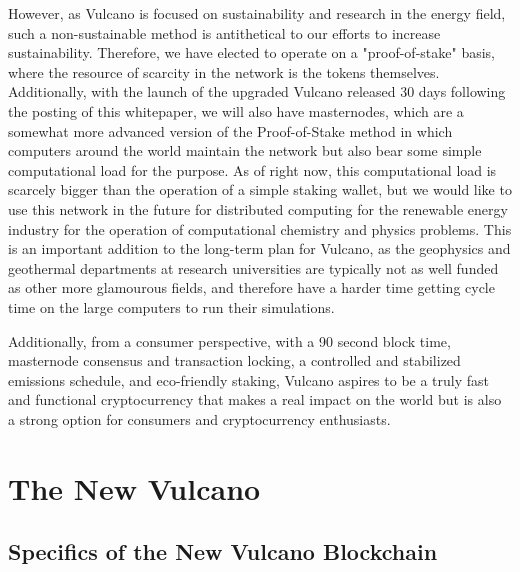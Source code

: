 \documentclass[A4paper, 12pt]{article}
\begin{document}
However, as Vulcano is focused on sustainability and research in the energy field, such a non-sustainable method is antithetical to our efforts to increase sustainability. Therefore, we have elected to operate on a "proof-of-stake" basis, where the resource of scarcity in the network is the tokens themselves. Additionally, with the launch of the upgraded Vulcano released 30 days following the posting of this whitepaper, we will also have masternodes, which are a somewhat more advanced version of the Proof-of-Stake method in which computers around the world maintain the network but also bear some simple computational load for the purpose. As of right now, this computational load is scarcely bigger than the operation of a simple staking wallet, but we would like to use this network in the future for distributed computing for the renewable energy industry for the operation of computational chemistry and physics problems. This is an important addition to the long-term plan for Vulcano, as the geophysics and geothermal departments at research universities are typically not as well funded as other more glamourous fields, and therefore have a harder time getting cycle time on the large computers to run their simulations. 

Additionally, from a consumer perspective, with a 90 second block time, masternode consensus and transaction locking, a controlled and stabilized emissions schedule, and eco-friendly staking, Vulcano aspires to be a truly fast and functional cryptocurrency that makes a real impact on the world but is also a strong option for consumers and cryptocurrency enthusiasts. 

\section{The New Vulcano}
\subsection{Specifics of the New Vulcano Blockchain}
\end{document}
